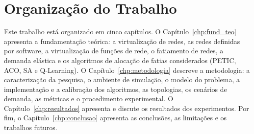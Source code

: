 \section{Organização do Trabalho}

Este trabalho está organizado em cinco capítulos. O Capítulo~\ref{chp:fund_teo} apresenta a fundamentação teórica: a virtualização de redes, as redes definidas por software, a virtualização de funções de rede, o fatiamento de redes, a demanda elástica e os algoritmos de alocação de fatias considerados (PETIC, ACO, SA e Q-Learning). O Capítulo~\ref{chp:metodologia} descreve a metodologia: a caracterização da pesquisa, o ambiente de simulação, o modelo do problema, a implementação e a calibração dos algoritmos, as topologias, os cenários de demanda, as métricas e o procedimento experimental. O Capítulo~\ref{chp:resultados} apresenta e discute os resultados dos experimentos. Por fim, o Capítulo~\ref{chp:conclusao} apresenta as conclusões, as limitações e os trabalhos futuros.
